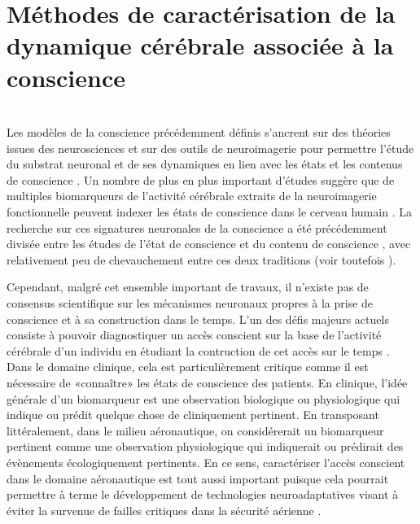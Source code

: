 \chapter{Méthodes de caractérisation de la dynamique cérébrale associée à la conscience}
\label{chapitre2}
\noindent \hrulefill \\

Les modèles de la conscience précédemment définis s'ancrent sur des théories issues des neurosciences et sur des outils de neuroimagerie pour permettre l'étude du substrat neuronal et de ses dynamiques en lien avec les états et les contenus de conscience \citep{aru2012distilling, dehaene2011experimental, khamassi2021neurosciences, kleiner2020mathematical, sattin2021theoretical, tagliazucchi2013sleep, taylor2011review, yaron2021consciousness}. 
Un nombre de plus en plus important d'études suggère que de multiples biomarqueurs de l'activité cérébrale extraits de la neuroimagerie fonctionnelle peuvent indexer les états de conscience dans le cerveau humain \citep{curley2018characterization, engemann2018robust, engemann2020combining, king2014characterizingthesis, liang2015eeg, sitt2014large}. 
La recherche sur ces signatures neuronales de la conscience a été précédemment divisée entre les études de l'état de conscience \citep{barttfeld2015signature, demertzi2019human} et du contenu de conscience \citep{schurger2015cortical, webb2016cortical}, avec relativement peu de chevauchement entre ces deux traditions (voir toutefois \cite{aru2019coupling}). 

Cependant, malgré cet ensemble important de travaux, il n'existe pas de consensus scientifique sur les mécanismes neuronaux propres à la prise de conscience et à sa construction dans le temps. 
L'un des défis majeurs actuels consiste à pouvoir diagnostiquer un accès conscient sur la base de l'activité cérébrale d'un individu en étudiant la contruction de cet accès sur le temps \citep{khamassi2021neurosciences}. 
Dans le domaine clinique, cela est particulièrement critique comme il est nécessaire de «connaître» les états de conscience des patients. 
En clinique, l'idée générale d'un biomarqueur est une observation biologique ou physiologique qui indique ou prédit quelque chose de cliniquement pertinent. 
En transposant littéralement, dans le milieu aéronautique, on considérerait un biomarqueur pertinent comme une observation physiologique qui indiquerait ou prédirait des évènements écologiquement pertinents. 
En ce sens, caractériser l'accès conscient dans le domaine aéronautique est tout aussi important puisque cela pourrait permettre à terme le développement de technologies neuroadaptatives visant à éviter la survenue de failles critiques dans la sécurité aérienne \citep{dehais2010perseveration, dehais2014failure, dehais2017eeg, dehais2019inattentional, scannella2013effects, scannella2018auditory}.


